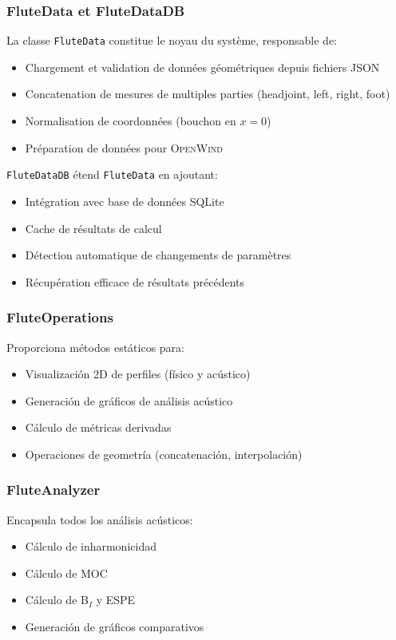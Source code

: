 \documentclass[12pt,a4paper,twocolumn]{article}
\newcommand{\openwind}{\textsc{OpenWind}}
\begin{document}
\subsubsection{FluteData et FluteDataDB}

La classe \texttt{FluteData} constitue le noyau du système, responsable de:
\begin{itemize}
    \item Chargement et validation de données géométriques depuis fichiers JSON
    \item Concatenation de mesures de multiples parties (headjoint, left, right, foot)
    \item Normalisation de coordonnées (bouchon en $x=0$)
    \item Préparation de données pour \openwind{}
\end{itemize}

\texttt{FluteDataDB} étend \texttt{FluteData} en ajoutant:
\begin{itemize}
    \item Intégration avec base de données SQLite
    \item Cache de résultats de calcul
    \item Détection automatique de changements de paramètres
    \item Récupération efficace de résultats précédents
\end{itemize}

\subsubsection{FluteOperations}

Proporciona métodos estáticos para:
\begin{itemize}
    \item Visualización 2D de perfiles (físico y acústico)
    \item Generación de gráficos de análisis acústico
    \item Cálculo de métricas derivadas
    \item Operaciones de geometría (concatenación, interpolación)
\end{itemize}

\subsubsection{FluteAnalyzer}

Encapsula todos los análisis acústicos:
\begin{itemize}
    \item Cálculo de inharmonicidad
    \item Cálculo de MOC
    \item Cálculo de B$_I$ y ESPE
    \item Generación de gráficos comparativos
\end{itemize}
\end{document}
